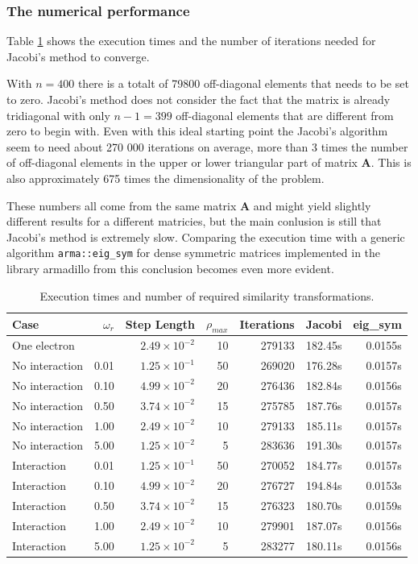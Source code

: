 \documentclass{article}
\begin{document}
\FloatBarrier
\subsubsection{The numerical performance}

Table \ref{tab:exec} shows the execution times and the number of iterations needed for Jacobi's method to converge. 

With $n=400$ there is a totalt of 79800 off-diagonal elements that needs to be set to zero. Jacobi's method does not consider the fact that the matrix is already tridiagonal with only $n-1=399$ off-diagonal elements that are different from zero to begin with. Even with this ideal starting point the Jacobi's algorithm seem to need about 270 000 iterations on average, more than 3 times the number of off-diagonal elements in the upper or lower triangular part of matrix $\bm{A}$. This is also approximately 675 times the dimensionality of the problem.

These numbers all come from the same matrix $\bm{A}$ and might yield slightly different results for a different matricies, but the main conlusion is still that Jacobi's method is extremely slow. Comparing the execution time with a generic algorithm \texttt{arma::eig\_sym} for dense symmetric matrices implemented in the library armadillo from \cite{arma} this conclusion becomes even more evident.

\begin{table}[h]
\centering
\caption{Execution times and number of required similarity transformations.}
\label{tab:exec}
\begin{tabularx}{\textwidth}{l r r r r r r }
\hline
Case & $\omega_r$ & Step Length & $\rho_{max}$ & Iterations & Jacobi & eig\_sym\\
\hline\hline
One electron &   & $2.49 \times 10^{-2}$ & 10 & 279133 &  182.45s &  0.0155s  \\
No interaction & 0.01 & $1.25 \times 10^{-1}$ & 50 & 269020 &  176.28s &  0.0157s  \\
No interaction & 0.10 & $4.99 \times 10^{-2}$ & 20 & 276436 &  182.84s &  0.0156s  \\
No interaction & 0.50 & $3.74 \times 10^{-2}$ & 15 & 275785 &  187.76s &  0.0157s  \\
No interaction & 1.00 & $2.49 \times 10^{-2}$ & 10 & 279133 &  185.11s &  0.0157s  \\
No interaction & 5.00 & $1.25 \times 10^{-2}$ &  5 & 283636 &  191.30s &  0.0157s  \\
Interaction & 0.01 & $1.25 \times 10^{-1}$ & 50 & 270052 &  184.77s &  0.0157s  \\
Interaction & 0.10 & $4.99 \times 10^{-2}$ & 20 & 276727 &  194.84s &  0.0153s  \\
Interaction & 0.50 & $3.74 \times 10^{-2}$ & 15 & 276323 &  180.70s &  0.0159s  \\
Interaction & 1.00 & $2.49 \times 10^{-2}$ & 10 & 279901 &  187.07s &  0.0156s  \\
Interaction & 5.00 & $1.25 \times 10^{-2}$ &  5 & 283277 &  180.11s &  0.0156s  \\
\hline
\end{tabularx}
\end{table}
\end{document}
